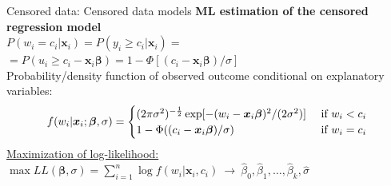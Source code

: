 \documentclass[usenames,dvipsnames]{beamer}
\newcommand{\mytikzmark}[2]{%
  \tikz[remember picture,inner sep=0pt,outer sep=0pt,baseline,anchor=base] 
    \node (#1) {\ensuremath{#2}};}
\begin{document}
\begin{frame}{Censored data: Censored data models}
\textbf{ML estimation of the censored regression model}\\
\bigskip
$P(w_i = c_i|\bm{x}_i) = P(y_i \ge c_i|\bm{x}_i) = $ \\
\smallskip
$ = P(u_i \ge c_i - \bm{x}_i \bm{\beta}) = 1-\Phi[(c_i - \bm{x}_i \bm{\beta})/\sigma] $ \\
\bigskip
Probability/density function of observed outcome conditional on explanatory variables:
\begin{align*}
f(w_i|\bm{x}_i; \bm{\beta}, \sigma) =
\begin{cases}
(2 \pi \sigma^2)^{- \frac{1}{2}} \exp [-(w_i - \bm{x}_i \bm{\beta})^2 / (2 \sigma^2)] & \ \text{if } \mytikzmark{1}{w_i} < c_i \\
1 - \Phi((c_i - \bm{x}_i \bm{\beta})/\sigma) & \ \text{if } w_i = c_i
\end{cases} 
\end{align*} 
\underline{Maximization of log-likelihood:} \\
$\max LL(\bm{\beta}, \sigma) = \sum \limits_{i=1}^{n} \log f(w_i|\bm{x}_i, c_i) \ \to \ \hat{\beta}_0, \hat{\beta}_1, \dots, \hat{\beta}_k, \hat{\sigma}$
\end{frame}
\end{document}

